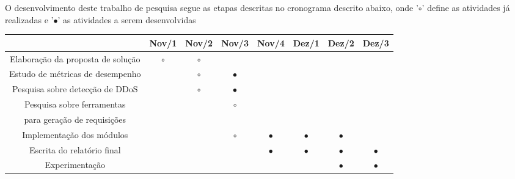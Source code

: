 
O desenvolvimento deste trabalho de pesquisa segue as etapas descritas no cronograma descrito abaixo, onde '$\circ$' define as atividades já realizadas e '$\bullet$' as atividades a serem desenvolvidas 
{\footnotesize
\center
\begin{table}[ht!]
\footnotesize
\center
\begin{tabular}{|c||c|c|c|c|c|c|c|}
\hline

      & \textbf{Nov/1} & \textbf{Nov/2} & \textbf{Nov/3} & \textbf{Nov/4} & \textbf{Dez/1} & \textbf{Dez/2} & \textbf{Dez/3} \\
\hline
\hline
Elaboração da proposta de solução      &  {$\circ$} & {$\circ$} &  &  &  &  &  \\
\hline						
Estudo de métricas de desempenho      &  & {$\circ$} & $\bullet$ &  &  & &  \\
\hline									

Pesquisa sobre detecção de DDoS      &  & {$\circ$} & $\bullet$  &  &  &  &  \\
\hline									


Pesquisa sobre ferramentas       &  &  & {$\circ$} &  &  &  &  \\
para geração de requisições       &   &   &   &   &   &   &   \\
\hline									


Implementação dos módulos      &  &  &  {$\circ$} & $\bullet$ & $\bullet$ & $\bullet$ &  \\
\hline									

Escrita do relatório final      &  &   &  & $\bullet$  & $\bullet$ &  $\bullet$ & $\bullet$ \\
\hline

Experimentação      &  &  &  &  &  & $\bullet$ & $\bullet$ \\
\hline
\end{tabular}
\label{tab:crono}
\end{table}
}
